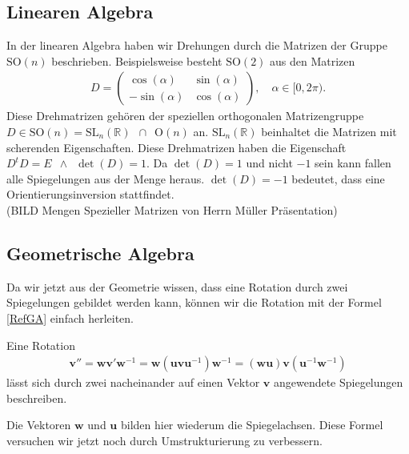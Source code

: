 \subsection{Linearen Algebra}
In der linearen Algebra haben wir Drehungen durch die Matrizen der Gruppe $\text{SO}(n)$ beschrieben. Beispielsweise besteht $\text{SO}(2)$  aus den Matrizen
\begin{align}
	D = 
	\begin{pmatrix}
		\cos(\alpha) & \sin(\alpha) \\
		-\sin(\alpha) & \cos(\alpha) 
	\end{pmatrix},\quad
	\alpha \in [0, 2\pi).
\end{align}
Diese Drehmatrizen gehören der speziellen orthogonalen Matrizengruppe $D\in \text{SO}(n) = \text{SL}_n(\mathbb{R})\enspace \cap \enspace \text{O}(n)$ an. $\text{SL}_n(\mathbb{R})$ beinhaltet die Matrizen mit scherenden Eigenschaften. Diese Drehmatrizen haben die Eigenschaft $D^t D = E \enspace \land \enspace \det(D)=1$. Da $\det(D) = 1$ und nicht $-1$ sein kann fallen alle Spiegelungen aus der Menge heraus. $\det(D) = -1$ bedeutet, dass eine Orientierungsinversion stattfindet.  
\\(BILD Mengen Spezieller Matrizen von Herrn Müller Präsentation)

\subsection{Geometrische Algebra}
Da wir jetzt aus der Geometrie wissen, dass eine Rotation durch zwei Spiegelungen gebildet werden kann, können wir die Rotation mit der Formel \eqref{RefGA} einfach herleiten.
\begin{satz}
	Eine Rotation 
	\begin{align} \label{rotGA}
		\mathbf{v}'' = \mathbf{wv}'\mathbf{w}^{-1} = \mathbf{w}(\mathbf{uvu}^{-1})\mathbf{w}^{-1} = (\mathbf{wu})\mathbf{v}(\mathbf{u}^{-1}\mathbf{w}^{-1})
	\end{align}
	lässt sich durch zwei nacheinander auf einen Vektor $\mathbf{v}$ angewendete Spiegelungen beschreiben.
\end{satz}
Die Vektoren $\mathbf{w}$ und $\mathbf{u}$ bilden hier wiederum die Spiegelachsen. Diese Formel versuchen wir jetzt noch durch Umstrukturierung zu verbessern. 
